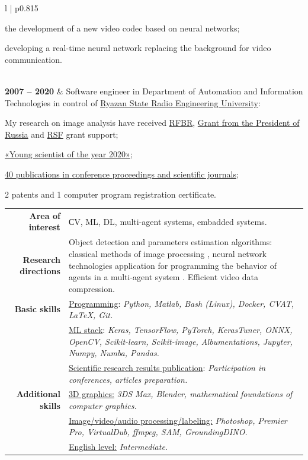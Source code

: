 \documentclass[11pt]{article}
\begin{document}
\begin{tabular} {l | p{}}
		\begin{tabitemize}
			\item the development of a new video codec based on neural networks;
			\item developing a real-time neural network replacing the background for video communication.
		\end{tabitemize}
\\[0.5em]
		\textbf{2007 -- 2020} & Software engineer in Department of Automation and Information Technologies in control of \href{http://www.rsreu.ru/en/}{Ryazan State Radio Engineering University}:
		\begin{tabitemize}
			\item My research on image analysis have received \href{https://www.rfbr.ru/project_search/350568/}{RFBR}, \href{https://grants.extech.ru/grants/res/winners.php?OZ=9&TZ=K&year=2016}{Grant from the President of Russia} and \href{http://rscf.ru/sites/default/files/docfiles/Winners_0029.pdf}{RSF} grant support;
			\item \href{https://ryazan.bezformata.com/listnews/aspiranti-rgrtu-pobediteli-konkursa/81548415/}{«Young scientist of the year 2020»};
			\item \hyperlink{AutorIDs}{40 publications in conference proceedings and scientific journals};
			\item 2 patents and 1 computer program registration certificate.
		\end{tabitemize}
	\end{tabular}%
	\vspace{0.3em}
	\begin{longtable} {r | p{}}
		\textbf{Area of interest} & СV, ML, DL, multi-agent systems, embadded systems.\\
		
		\textbf{Research directions} & Object detection and parameters estimation algorithms: classical methods of image processing \cite{wrt}, neural network technologies application for programming the behavior of agents in a multi-agent system \cite{mas}. Efficient video data compression.\\
		
		\textbf{Basic skills} & \underline{Programming}: \it{Python, Matlab, Bash (Linux), Docker, CVAT, \LaTeX, Git.}\\ 
		& \underline{ML stack}: \it{Keras, TensorFlow, PyTorch, KerasTuner, ONNX, OpenCV, Scikit-learn, Scikit-image, Albumentations, Jupyter, Numpy, Numba, Pandas.}\\
		& \underline{Scientific research results publication}: \it{Participation in conferences, articles preparation.}\\
		
		\textbf{Additional skills} & \underline{3D graphics:} \it{3DS Max, Blender, mathematical foundations of computer graphics.}\\
		& \underline{Image/video/audio processing/labeling:} \it{Photoshop, Premier Pro, VirtualDub, ffmpeg, SAM, GroundingDINO.}\\
		& \underline{English level:} \it{Intermediate.}\\
	\end{longtable}		
	
\end{document}
